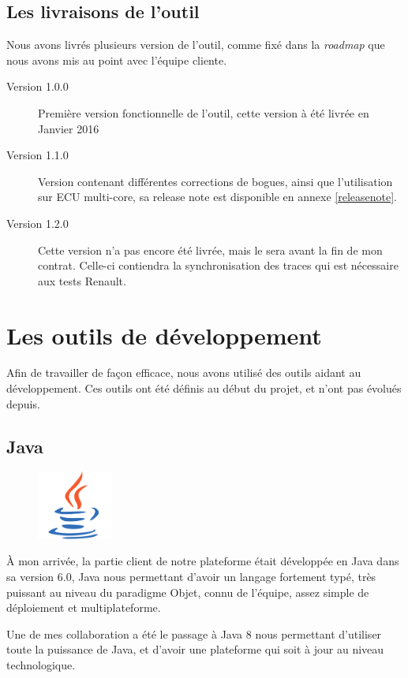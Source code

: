 \subsection{Les livraisons de l'outil}
\vspace{-15px}
Nous avons livrés plusieurs version de l'outil, comme fixé dans la \textit{roadmap} que nous avons mis au point avec l'équipe cliente.
\vspace{-15px}
\begin{description}
\item[Version 1.0.0] Première version fonctionnelle de l'outil, cette version à été livrée en Janvier 2016
\item[Version 1.1.0] Version contenant différentes corrections de bogues, ainsi que l'utilisation sur ECU multi-core, sa release note est disponible en annexe \ref{releasenote}.
\item[Version 1.2.0] Cette version n'a pas encore été livrée, mais le sera avant la fin de mon contrat. Celle-ci contiendra la synchronisation des traces qui est nécessaire aux tests Renault. 
\end{description}

\section{Les outils de développement}
Afin de travailler de façon efficace, nous avons utilisé des outils aidant au développement. Ces outils ont été définis au début du projet, et n'ont pas évolués depuis.
\subsection{Java}
\begin{figure}
	\includegraphics[width=2.5cm]{contents/images/logoJava.png}
\end{figure}
À mon arrivée, la partie client de notre plateforme était développée en Java dans sa version 6.0, Java nous permettant d'avoir un langage fortement typé, très puissant au niveau du paradigme Objet, connu de l'équipe, assez simple de déploiement et multiplateforme. 

Une de mes collaboration a été le passage à Java 8 nous permettant d'utiliser toute la puissance de Java, et d'avoir une plateforme qui soit à jour au niveau technologique.


